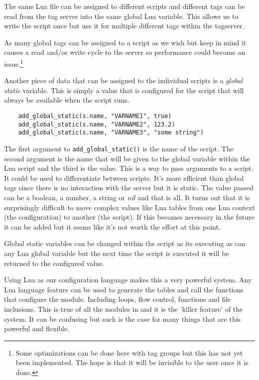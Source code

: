 The same Lua file can be assigned to different scripts and different tags can be read from the
tag server into the same global Lua variable.  This allows us to write the script once but use
it for multiple different tags within the tagserver.

As many global tags can be assigned to a script as we wish but keep in mind it causes a read and/or
write cycle to the server so performance could become an issue.\footnote{Some optimizations can be done
here with tag groups but this has not yet been implemented.  The hope is that it will be invisible
to the user once it is done.}

Another piece of data that can be assigned to the individual scripts is a \textit{global static}
variable.  This is simply a value that is configured for the script that will always be
available when the script runs.

\begin{verbatim}
	add_global_static(s.name, "VARNAME1", true)
	add_global_static(s.name, "VARNAME2", 123.2)
	add_global_static(s.name, "VARNAME3", "some string")
\end{verbatim}

The first argument to \texttt{add\_global\_static()} is the name of the script.  The second
argument is the name that will be given to the global variable within the Lua script and
the third is the value.  This is a way to pass arguments to a script.  It could be used
to differentiate between scripts.  It's more efficient than global tags since there is no
interaction with the server but it is static.  The value passed can be a boolean, a number,
a string or \textit{nil} and that is all.  It turns out that it is surprisingly difficult
to move complex values like Lua tables from one Lua context (the configuration) to another
(the script).  If this becomes necessary in the future it can be added but it seems like it's
not worth the effort at this point.

Global static variables can be changed within the script as its executing as can any Lua
global variable but the next time the script is executed it will be returned to the
configured value.

Using Lua as our configuration language makes this a very powerful system.  Any Lua language
feature can be used to generate the tables and call the functions that configure the module.
Including loops, flow control, functions and file inclusions.
This is true of all the modules in \opendax{} and it is the 'killer feature' of
the system.  It can be confusing but such is the case for many things that are this powerful
and flexible.

